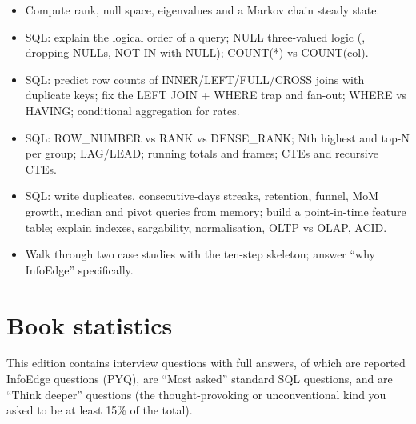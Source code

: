 \begin{itemize}
\item Compute rank, null space, eigenvalues and a Markov chain steady state.
\item SQL: explain the logical order of a query; NULL three-valued logic (, \code{<>} dropping NULLs, NOT IN with NULL); COUNT(*) vs COUNT(col).
\item SQL: predict row counts of INNER/LEFT/FULL/CROSS joins with duplicate keys; fix the LEFT JOIN + WHERE trap and fan-out; WHERE vs HAVING; conditional aggregation for rates.
\item SQL: ROW\_NUMBER vs RANK vs DENSE\_RANK; Nth highest and top-N per group; LAG/LEAD; running totals and frames; CTEs and recursive CTEs.
\item SQL: write duplicates, consecutive-days streaks, retention, funnel, MoM growth, median and pivot queries from memory; build a point-in-time feature table; explain indexes, sargability, normalisation, OLTP vs OLAP, ACID.
\item Walk through two case studies with the ten-step skeleton; answer ``why InfoEdge'' specifically.
\end{itemize}

\section*{Book statistics}
This edition contains \textbf{} interview questions with full answers, of which \textbf{} are reported InfoEdge questions (PYQ),
\textbf{} are ``Most asked'' standard SQL questions, and
\textbf{} are ``Think deeper'' questions (the thought-provoking or unconventional kind you asked to be at least 15\% of the total).
